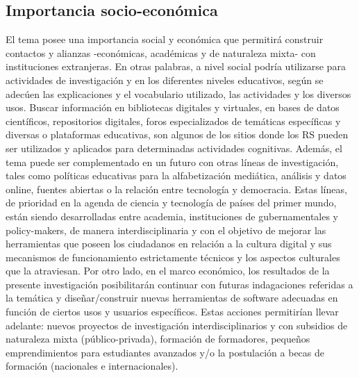 \subsection{Importancia socio-económica}
El tema posee una importancia social y económica que permitirá construir contactos y alianzas -económicas, académicas y de naturaleza mixta- con instituciones extranjeras. En otras palabras, a nivel social podría utilizarse para actividades de investigación y en los diferentes niveles educativos, según se adecúen las explicaciones y el vocabulario utilizado, las actividades y los diversos usos. Buscar información en bibliotecas digitales y virtuales, en bases de datos científicos, repositorios digitales, foros especializados de temáticas específicas y diversas o plataformas educativas, son algunos de los sitios donde los RS pueden ser utilizados y aplicados para determinadas actividades cognitivas. Además, el tema puede ser complementado en un futuro con otras líneas de investigación, tales como políticas educativas para la alfabetización mediática, análisis y datos online, fuentes abiertas o la relación entre tecnología y democracia. Estas líneas, de prioridad en la agenda de ciencia y tecnología de países del primer mundo, están siendo desarrolladas entre academia, instituciones de gubernamentales y policy-makers, de manera interdisciplinaria y con el objetivo de mejorar las herramientas que poseen los ciudadanos en relación a la cultura digital y sus mecanismos de funcionamiento estrictamente técnicos y los aspectos culturales que la atraviesan.
Por otro lado, en el marco económico, los resultados de la presente investigación posibilitarán continuar con futuras indagaciones referidas a la temática y diseñar/construir nuevas herramientas de software adecuadas en función de ciertos usos y usuarios específicos. Estas acciones permitirían llevar adelante: nuevos proyectos de investigación interdisciplinarios y con subsidios de naturaleza mixta (público-privada), formación de formadores, pequeños emprendimientos para estudiantes avanzados y/o la postulación a becas de formación (nacionales e internacionales).



